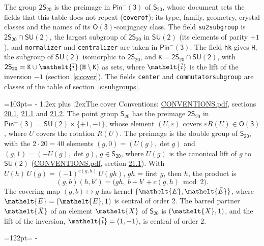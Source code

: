 \documentclass[10pt,a4paper]{article}
\makeatletter
\renewcommand\section{\@startsection{section}{1}{\z@}{-3ex plus -1ex minus -.2ex}%
  {1.2ex plus .2ex}{\normalfont\large\sffamily\bfseries\color{parttitle}}}
\newcommand{\needspace}[1]{\par\penalty-100\begingroup\dimen0=#1\relax\dimen2=\pagegoal
  \advance\dimen2-\pagetotal\ifdim\dimen0>\dimen2\relax\ifdim\dimen2>0pt\vfil\break\fi\fi
  \endgroup}
\numberwithin{equation}{section}
\newcommand{\eltfont}[1]{{\let\sigma\eltsigma\mathelt{#1}}}
\newcommand{\grp}[1]{\mathsf{#1}}
\newcommand{\elt}[1]{\eltfont{#1}}
\newcommand{\dirprod}{\times}
\newcommand{\barred}[1]{\bar{#1}}
\newcommand{\lift}[1]{\tilde{#1}}
\makeatother
\begin{document}
\leavevmode\label{n:element.inversion}\label{n:group.preimage}The group $\grp{2S_{20}}$ is the preimage in $\grp{Pin^{-}(3)}$ of \href{../../../rotation/data/pdf/S20.pdf}{$\grp{S_{20}}$}, whose document sets the fields that this table does not repeat (\texttt{coverof}): its type, family, geometry, crystal classes and the names of its \href{../../../rotation/data/pdf/O3.pdf}{$\grp{O(3)}$}-conjugacy class. The field \texttt{su2subgroup} is $\grp{2S_{20}} \cap \grp{SU(2)}$, the largest subgroup of $\grp{2S_{20}}$ in $\grp{SU(2)}$ (its elements of parity $+1$), and \texttt{normalizer} and \texttt{centralizer} are taken in $\grp{Pin^{-}(3)}$. The field \texttt{hk} gives \texttt{H}, the subgroup of $\grp{SU(2)}$ isomorphic to $\grp{2S_{20}}$, and \texttt{K}${} = \grp{2S_{20}} \cap \grp{SU(2)}$, with $\grp{2S_{20}} = \texttt{K} \cup \elt{\lift{i}}\,(\texttt{H} \setminus \texttt{K})$ as sets, where $\elt{\lift{i}}$ is the lift of the inversion $-1$ (section~\ref{s:cover}). The fields \texttt{center} and \texttt{commutatorsubgroup} are classes of the table of section~\ref{s:subgroups}.
\needspace{103pt}
\section{The cover}\label{s:cover}
Conventions: \href{../../CONVENTIONS.pdf}{CONVENTIONS.pdf}, sections \href{../../CONVENTIONS.pdf\#conv.20.1}{20.1}, \href{../../CONVENTIONS.pdf\#conv.21.1}{21.1} and \href{../../CONVENTIONS.pdf\#conv.21.2}{21.2}.
\leavevmode\label{n:group.pin.minus}\label{n:group.su2}\label{n:local.pin.sign}\label{n:matrix.covered}\label{n:matrix.lift.su2}\label{n:index.bar}The point group $\grp{S_{20}}$ has the preimage $\grp{2S_{20}}$ in $\grp{Pin^{-}(3)} = \grp{SU(2)} \dirprod \{+1, -1\}$, whose element $(U, \varepsilon)$ covers $\varepsilon R(U) \in \grp{O(3)}$, where $U$ covers the rotation $R(U)$. The preimage is the double group of $\grp{S_{20}}$, with the $2 \cdot 20 = 40$ elements $(g, 0) = (U(g), \det g)$ and $(g, 1) = (-U(g), \det g)$, $g \in \grp{S_{20}}$, where $U(g)$ is the canonical lift of $g$ to $\grp{SU(2)}$ (\href{../../CONVENTIONS.pdf}{CONVENTIONS.pdf}, section \href{../../CONVENTIONS.pdf\#conv.21.1}{21.1}). \label{n:function.cocycle}With $U(h)\,U(g) = (-1)^{c(g,h)}\,U(gh)$, $gh$ = first $g$, then $h$, the product is
\begin{equation}\label{e:product}(g, b)(h, b') = \bigl(gh,\ b + b' + c(g, h) \bmod 2\bigr).\end{equation}
\leavevmode\label{n:mark.bar}The covering map $(g, b) \mapsto g$ has kernel $\{\elt{E}, \elt{\barred{E}}\}$, where $\elt{\barred{E}} = (\elt{E}, 1)$ is central of order 2. \label{n:element.named}\label{n:mark.lift}The barred partner $\elt{\barred{X}}$ of an element $\elt{X}$ of $\grp{S_{20}}$ is $(\elt{X}, 1)$, and the lift of the inversion, $\elt{\lift{i}} = (1, -1)$, is central of order 2.
\needspace{122pt}
\end{document}
